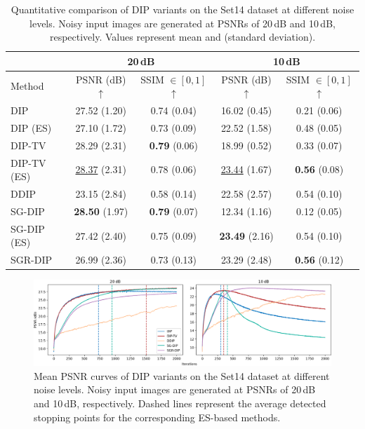 \begin{table}
    \small
    \centering
    \begin{tabular}{ l c c c c }
        \toprule
        &\multicolumn{2}{c}{20\,dB} &\multicolumn{2}{c}{10\,dB}\\
        \midrule
        Method &PSNR (dB) $\uparrow$ &SSIM $\in [0,1]$ $\uparrow$ &PSNR (dB) $\uparrow$ &SSIM $\in [0,1]$ $\uparrow$\\
        \midrule
        DIP &27.52 {\scriptsize (1.20)} &0.74 {\scriptsize (0.04)} &16.02 {\scriptsize (0.45)} &0.21 {\scriptsize (0.06)} \\
        DIP (ES) &27.10 {\scriptsize (1.72)} &0.73 {\scriptsize (0.09)} &22.52 {\scriptsize (1.58)} &0.48 {\scriptsize (0.05)} \\
        DIP-TV &28.29 {\scriptsize (2.31)} &\textbf{0.79} {\scriptsize (0.06)} &18.99 {\scriptsize (0.52)} &0.33 {\scriptsize (0.07)} \\
        DIP-TV (ES) &\underline{28.37} {\scriptsize (2.31)} &0.78 {\scriptsize (0.06)} &\underline{23.44} {\scriptsize (1.67)} &\textbf{0.56} {\scriptsize (0.08)} \\
        DDIP &23.15 {\scriptsize (2.84)} &0.58 {\scriptsize (0.14)} &22.58 {\scriptsize (2.57)} &0.54 {\scriptsize (0.10)} \\
        SG-DIP &\textbf{28.50} {\scriptsize (1.97)} &\textbf{0.79} {\scriptsize (0.07)} &12.34 {\scriptsize (1.16)} &0.12 {\scriptsize (0.05)} \\
        SG-DIP (ES) &27.42 {\scriptsize (2.40)} &0.75 {\scriptsize (0.09)} &\textbf{23.49} {\scriptsize (2.16)} &0.54 {\scriptsize (0.10)} \\
        SGR-DIP &26.99 {\scriptsize (2.36)} &0.73 {\scriptsize (0.13)} &23.29 {\scriptsize (2.48)} &\textbf{0.56} {\scriptsize (0.12)} \\
        \bottomrule
    \end{tabular}
    \caption{
        Quantitative comparison of DIP variants on the Set14 dataset at different noise levels.
        Noisy input images are generated at PSNRs of 20\,dB and 10\,dB, respectively.
        Values represent mean and {\scriptsize (standard deviation)}.
    }\label{tab:noise-levels}
\end{table}

\begin{figure}
    \centering
    \includegraphics[width=\textwidth]{img/fig_6.2.png}
    \caption{
        Mean PSNR curves of DIP variants on the Set14 dataset at different noise levels.
        Noisy input images are generated at PSNRs of 20\,dB and 10\,dB, respectively.
        Dashed lines represent the average detected stopping points for the corresponding ES-based methods.
    }\label{fig:noise-levels}
\end{figure}

